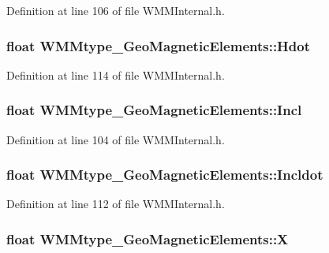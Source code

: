 \-Definition at line 106 of file \-W\-M\-M\-Internal.\-h.

\hypertarget{struct_w_m_mtype___geo_magnetic_elements_aa1e42deb6458e019df1619c0fec2ba3c}{
\subsubsection[{\-Hdot}]{\setlength{\rightskip}{0pt plus 5cm}float {\bf \-W\-M\-Mtype\-\_\-\-Geo\-Magnetic\-Elements\-::\-Hdot}}}\label{struct_w_m_mtype___geo_magnetic_elements_aa1e42deb6458e019df1619c0fec2ba3c}


\-Definition at line 114 of file \-W\-M\-M\-Internal.\-h.

\hypertarget{struct_w_m_mtype___geo_magnetic_elements_a7457bb44f79e87703e2c83bab3c71ae9}{
\subsubsection[{\-Incl}]{\setlength{\rightskip}{0pt plus 5cm}float {\bf \-W\-M\-Mtype\-\_\-\-Geo\-Magnetic\-Elements\-::\-Incl}}}\label{struct_w_m_mtype___geo_magnetic_elements_a7457bb44f79e87703e2c83bab3c71ae9}


\-Definition at line 104 of file \-W\-M\-M\-Internal.\-h.

\hypertarget{struct_w_m_mtype___geo_magnetic_elements_aac0feb3987db9841acd278f27f0726c7}{
\subsubsection[{\-Incldot}]{\setlength{\rightskip}{0pt plus 5cm}float {\bf \-W\-M\-Mtype\-\_\-\-Geo\-Magnetic\-Elements\-::\-Incldot}}}\label{struct_w_m_mtype___geo_magnetic_elements_aac0feb3987db9841acd278f27f0726c7}


\-Definition at line 112 of file \-W\-M\-M\-Internal.\-h.

\hypertarget{struct_w_m_mtype___geo_magnetic_elements_af81004bb2f8cd436246b1b4240d1acc9}{
\subsubsection[{\-X}]{\setlength{\rightskip}{0pt plus 5cm}float {\bf \-W\-M\-Mtype\-\_\-\-Geo\-Magnetic\-Elements\-::\-X}}}\label{struct_w_m_mtype___geo_magnetic_elements_af81004bb2f8cd436246b1b4240d1acc9}


